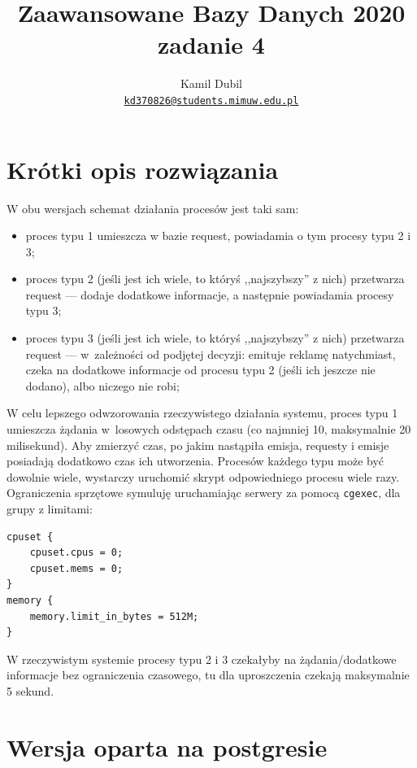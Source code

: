 \documentclass[a4paper,11pt]{article}
\title{Zaawansowane Bazy Danych 2020\\
\large zadanie 4}
\author{Kamil Dubil\\
\href{mailto:kd370826@students.mimuw.edu.pl}{\tt kd370826@students.mimuw.edu.pl}}
\begin{document}
\maketitle


\section{Krótki opis rozwiązania}

W obu wersjach schemat działania procesów jest taki sam:
\begin{itemize}
  \item proces typu 1 umieszcza w bazie request, powiadamia o tym procesy typu 2 i 3;
  \item proces typu 2 (jeśli jest ich wiele, to któryś ,,najszybszy'' z nich) przetwarza request --- dodaje dodatkowe informacje,
    a następnie powiadamia procesy typu 3;
  \item proces typu 3 (jeśli jest ich wiele, to któryś ,,najszybszy'' z nich) przetwarza request --- w~zależności od podjętej decyzji: emituje
    reklamę natychmiast, czeka na dodatkowe informacje od procesu typu 2 (jeśli ich jeszcze nie dodano), albo niczego nie robi;
\end{itemize}
W celu lepszego odwzorowania rzeczywistego działania systemu, proces typu 1 umieszcza żądania w~losowych odstępach czasu (co najmniej 10, maksymalnie 20 milisekund).
Aby zmierzyć czas, po jakim nastąpiła emisja, requesty i emisje posiadają dodatkowo czas ich utworzenia. Procesów każdego typu może być dowolnie wiele,
wystarczy uruchomić skrypt odpowiedniego procesu wiele razy. Ograniczenia sprzętowe symuluję uruchamiając serwery za pomocą \texttt{cgexec}, dla grupy
z limitami:
\begin{lstlisting}
cpuset {
    cpuset.cpus = 0;
    cpuset.mems = 0;
}
memory {
    memory.limit_in_bytes = 512M;
}
\end{lstlisting}
W rzeczywistym systemie procesy typu 2 i 3 czekałyby na żądania/dodatkowe informacje bez ograniczenia czasowego,
tu dla uproszczenia czekają maksymalnie 5 sekund.

\section{Wersja oparta na postgresie}
\end{document}

